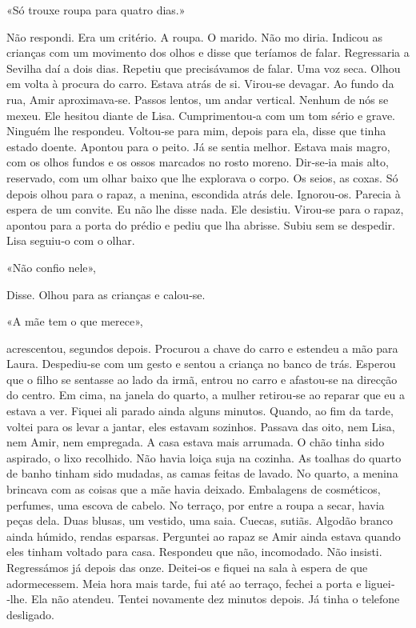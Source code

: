 «Só trouxe roupa para quatro dias.»

Não respondi. Era um critério. A roupa. O marido. Não mo diria. Indicou
as crianças com um movimento dos olhos e disse que teríamos de falar.
Regressaria a Sevilha daí a dois dias. Repetiu que precisávamos de
falar. Uma voz seca. Olhou em volta à procura do carro. Estava atrás de
si. Virou­‑se devagar. Ao fundo da rua, Amir aproximava­‑se. Passos
lentos, um andar vertical. Nenhum de nós se mexeu. Ele hesitou diante de
Lisa. Cumprimentou­‑a com um tom sério e grave. Ninguém lhe respondeu.
Voltou­‑se para mim, depois para ela, disse que tinha estado doente.
Apontou para o peito. Já se sentia melhor. Estava mais magro, com os
olhos fundos e os ossos marcados no rosto moreno. Dir­‑se­‑ia mais alto,
reservado, com um olhar baixo que lhe explorava o corpo. Os seios, as
coxas. Só depois olhou para o rapaz, a menina, escondida atrás dele.
Ignorou­‑os. Parecia à espera de um convite. Eu não lhe disse nada. Ele
desistiu. Virou­‑se para o rapaz, apontou para a porta do prédio e pediu
que lha abrisse. Subiu sem se despedir. Lisa seguiu­‑o com o olhar.

«Não confio nele»,

Disse. Olhou para as crianças e calou­‑se.

«A mãe tem o que merece»,

acrescentou, segundos depois. Procurou a chave do carro e estendeu a mão
para Laura. Despediu­‑se com um gesto e sentou a criança no banco de
trás. Esperou que o filho se sentasse ao lado da irmã, entrou no carro e
afastou­‑se na direcção do centro. Em cima, na janela do quarto, a
mulher retirou­‑se ao reparar que eu a estava a ver. Fiquei ali parado
ainda alguns minutos. Quando, ao fim da tarde, voltei para os levar a
jantar, eles estavam sozinhos. Passava das oito, nem Lisa, nem Amir, nem
empregada. A casa estava mais arrumada. O chão tinha sido aspirado, o
lixo recolhido. Não havia loiça suja na cozinha. As toalhas do quarto de
banho tinham sido mudadas, as camas feitas de lavado. No quarto, a
menina brincava com as coisas que a mãe havia deixado. Embalagens de
cosméticos, perfumes, uma escova de cabelo. No terraço, por entre a
roupa a secar, havia peças dela. Duas blusas, um vestido, uma saia.
Cuecas, sutiãs. Algodão branco ainda húmido, rendas esparsas. Perguntei
ao rapaz se Amir ainda estava quando eles tinham voltado para casa.
Respondeu que não, incomodado. Não insisti. Regressámos já depois das
onze. Deitei­‑os e fiquei na sala à espera de que adormecessem. Meia
hora mais tarde, fui até ao terraço, fechei a porta e liguei­‑lhe. Ela
não atendeu. Tentei novamente dez minutos depois. Já tinha o telefone
desligado.


